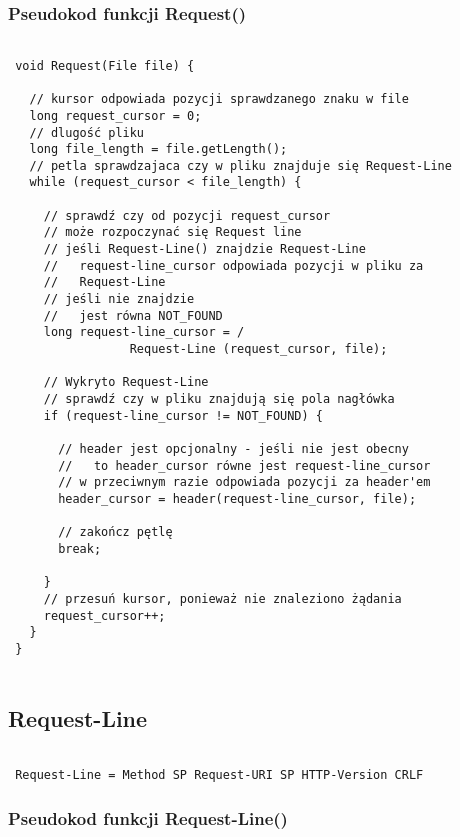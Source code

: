 \documentclass[a4paper,11pt]{report}
\begin{document}
\subsubsection{Pseudokod funkcji Request()}

\begin{lstlisting}

 void Request(File file) {
   
   // kursor odpowiada pozycji sprawdzanego znaku w file
   long request_cursor = 0;
   // dlugość pliku
   long file_length = file.getLength();
   // petla sprawdzajaca czy w pliku znajduje się Request-Line
   while (request_cursor < file_length) {
   
     // sprawdź czy od pozycji request_cursor
     // może rozpoczynać się Request line
     // jeśli Request-Line() znajdzie Request-Line
     //   request-line_cursor odpowiada pozycji w pliku za
     //   Request-Line 
     // jeśli nie znajdzie
     //   jest równa NOT_FOUND   
     long request-line_cursor = /
                 Request-Line (request_cursor, file);
         
     // Wykryto Request-Line
     // sprawdź czy w pliku znajdują się pola nagłówka
     if (request-line_cursor != NOT_FOUND) {
             
       // header jest opcjonalny - jeśli nie jest obecny
       //   to header_cursor równe jest request-line_cursor
       // w przeciwnym razie odpowiada pozycji za header'em
       header_cursor = header(request-line_cursor, file);
             
       // zakończ pętlę
       break;
       
     }
     // przesuń kursor, ponieważ nie znaleziono żądania
     request_cursor++; 
   }
 }
 
\end{lstlisting}

\subsection{Request-Line}

\begin{lstlisting}

 Request-Line = Method SP Request-URI SP HTTP-Version CRLF

\end{lstlisting}

\subsubsection{Pseudokod funkcji Request-Line()}
\end{document}
